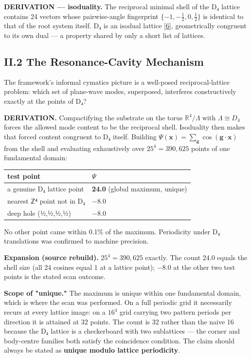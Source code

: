 \documentclass[a4paper,11pt]{article}
\newcommand{\expansion}[1]{\par\smallskip\noindent\textbf{Expansion (source rebuild).} #1\par\smallskip}
\begin{document}
\textbf{DERIVATION — isoduality.} The reciprocal minimal shell of the D₄ lattice contains 24 vectors whose pairwise-angle fingerprint $\{-1,-\tfrac12,0,\tfrac12\}$ is identical to that of the root system itself. D₄ is an isodual lattice \hyperref[ref6]{[6]}, geometrically congruent to its own dual — a property shared by only a short list of lattices.

\subsection*{II.2 The Resonance-Cavity Mechanism}

The framework's informal cymatics picture is a well-posed reciprocal-lattice problem: which set of plane-wave modes, superposed, interferes constructively exactly at the points of D₄?

\textbf{DERIVATION.} Compactifying the substrate on the torus $\mathbb{R}^4/\Lambda$ with $\Lambda\cong D_4$ forces the allowed mode content to be the reciprocal shell. Isoduality then makes that forced content congruent to D₄ itself. Building $\Psi(\mathbf{x})=\sum_{\mathbf{g}}\cos(\mathbf{g}\cdot\mathbf{x})$ from the shell and evaluating exhaustively over $25^4=390{,}625$ points of one fundamental domain:

\begin{center}
\begin{tabular}{ll}
\hline
test point & $\Psi$ \\
\hline
a genuine D₄ lattice point & \textbf{24.0} (global maximum, unique) \\
nearest ℤ⁴ point not in D₄ & $-$8.0 \\
deep hole (½,½,½,½) & $-$8.0 \\
\hline
\end{tabular}
\end{center}

No other point came within 0.1\% of the maximum. Periodicity under D₄ translations was confirmed to machine precision.


\expansion{$25^4 = 390{,}625$ exactly. The count 24.0 equals the shell size (all 24 cosines equal 1 at a lattice point); $-8.0$ at the other two test points is the stated scan outcome.}
\textbf{Scope of "unique."} The maximum is unique within one fundamental domain, which is where the scan was performed. On a full periodic grid it necessarily recurs at every lattice image: on a $16^4$ grid carrying two pattern periods per direction it is attained at 32 points. The count is 32 rather than the naive 16 because the D₄ lattice is a checkerboard with two sublattices — the corner and body-centre families both satisfy the coincidence condition. The claim should always be stated as \textbf{unique modulo lattice periodicity}.
\end{document}
